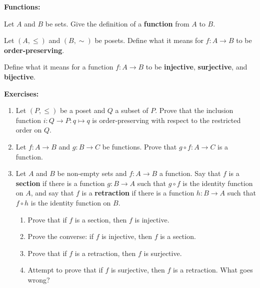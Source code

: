 \documentclass{article}
\begin{document}
\clearpage





\textbf{Functions:}\bigskip



Let $A$ and $B$ be sets. Give the definition of a \textbf{function} from $A$ to $B$.\bigskip


Let $(A,\leq)$ and $(B,\sim)$ be posets. Define what it means for $f:A\to B$ to be \textbf{order-preserving}.



\vfill




Define what it means for a function $f:A\to B$ to be \textbf{injective}, \textbf{surjective}, and \textbf{bijective}.


\vfill


\clearpage










\textbf{Exercises:}\bigskip

\begin{enumerate}
	\item Let $(P,\leq)$ be a poset and $Q$ a subset of $P$. Prove that the inclusion function $i:Q\to P:q\mapsto q$ is order-preserving with respect to the restricted order on $Q$.
	\item Let $f:A\to B$ and $g:B\to  C$ be functions. Prove that $g\circ f:A\to C$ is a function.
	\item Let $A$ and $B$ be non-empty sets and $f:A\to B$ a function. Say that $f$ is a \textbf{section} if there is a function $g:B\to A$ such that $g\circ f$ is the identity function on $A$, and say that $f$ is a \textbf{retraction} if there is a function $h:B\to A$ such that $f\circ h$ is the identity function on $B$.
		\begin{enumerate}
			\item Prove that if $f$ is a section, then $f$ is injective.
			\item Prove the converse: if $f$ is injective, then $f$ is a section.
			\item Prove that if $f$ is a retraction, then $f$ is surjective.
			\item Attempt to prove that if $f$ is surjective, then $f$ is a retraction. What goes wrong?
		\end{enumerate}
\end{enumerate}
\end{document}
